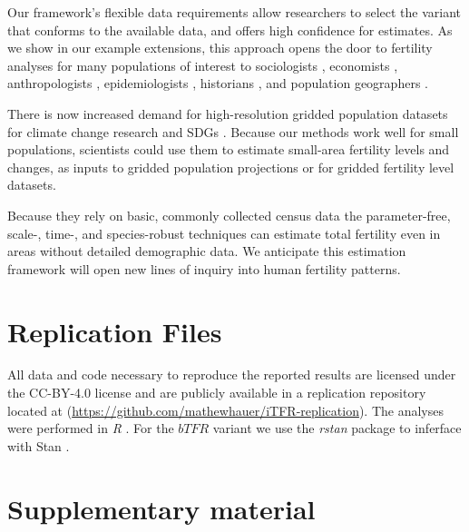 \documentclass[12pt]{article}
\begin{document}
Our framework's flexible data requirements allow researchers to select
the variant that conforms to the available data, and offers high
confidence for estimates. As we show in our example extensions, this
approach opens the door to fertility analyses for many populations of
interest to sociologists \citep{lesthaeghe14}, economists
\citep{hotz1997economics}, anthropologists
\citep{greenhalgh1995situating}, epidemiologists
\citep{paulson2002pregnancy}, historians \citep{woods2000demography},
and population geographers \citep{sorichetta2015high}.

There is now increased demand for high-resolution gridded population
datasets for climate change research and SDGs
\citep{jones15, cincotta00, golding2017mapping}. Because our methods
work well for small populations, scientists could use them to estimate
small-area fertility levels and changes, as inputs to gridded population
projections or for gridded fertility level datasets.

Because they rely on basic, commonly collected census data the
parameter-free, scale-, time-, and species-robust techniques can
estimate total fertility even in areas without detailed demographic
data. We anticipate this estimation framework will open new lines of
inquiry into human fertility patterns.

\hypertarget{replication-files}{%
\section{Replication Files}\label{replication-files}}

All data and code necessary to reproduce the reported results are
licensed under the CC-BY-4.0 license and are publicly available in a
replication repository located at
(\url{https://github.com/mathewhauer/iTFR-replication}). The analyses
were performed in \emph{R} \citep{rcite}. For the \(bTFR\) variant we
use the \emph{rstan} package \citep{rstanpackage} to inferface with Stan
\citep{stanjss2017}.

\newpage

\hypertarget{supplementary-material}{%
\section*{Supplementary material}\label{supplementary-material}}

\setcounter{table}{0} \renewcommand{\thetable}{S\arabic{table}}\setcounter{figure}{0} \renewcommand{\thefigure}{S\arabic{figure}}
\end{document}
